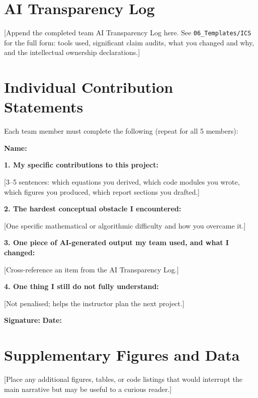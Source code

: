 \documentclass[11pt,a4paper]{article}
\theoremstyle{definition}
\theoremstyle{remark}
\begin{document}
\newpage
\appendix
\section{AI Transparency Log}

[Append the completed team AI Transparency Log here. See
\texttt{06\_Templates/ICS} for the full form: tools used, significant claim audits,
what you changed and why, and the intellectual ownership declarations.]

\section{Individual Contribution Statements}

Each team member must complete the following (repeat for all 5 members):

\begin{formbox}
\textbf{Name:} \underline{\hspace{5cm}}

\vspace{0.5em}
\textbf{1. My specific contributions to this project:}

[3--5 sentences: which equations you derived, which code modules you wrote,
which figures you produced, which report sections you drafted.]

\vspace{0.5em}
\textbf{2. The hardest conceptual obstacle I encountered:}

[One specific mathematical or algorithmic difficulty and how you overcame it.]

\vspace{0.5em}
\textbf{3. One piece of AI-generated output my team used, and what I changed:}

[Cross-reference an item from the AI Transparency Log.]

\vspace{0.5em}
\textbf{4. One thing I still do not fully understand:}

[Not penalised; helps the instructor plan the next project.]

\vspace{0.5em}
\textbf{Signature:} \underline{\hspace{4cm}} \quad \textbf{Date:} \underline{\hspace{2cm}}
\end{formbox}

\section{Supplementary Figures and Data}

[Place any additional figures, tables, or code listings that would interrupt the
main narrative but may be useful to a curious reader.]
\end{document}
